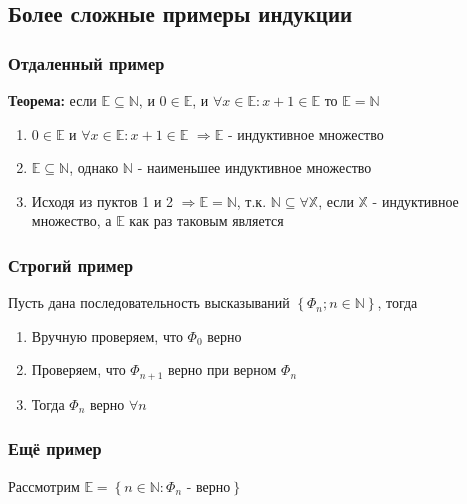 \documentclass[class=article,a4paper,12pt,crop=false]{standalone}
\begin{document}
\subsection{Более сложные примеры индукции}

\subsubsection{Отдаленный пример}

\textbf{Теорема:} если $\mathbb{E} \subseteq \mathbb{N}$, и
$0 \in \mathbb{E}$, и $\forall x \in \mathbb{E}: x + 1 \in \mathbb{E}$
то $\mathbb{E} = \mathbb{N}$

\begin{enumerate}
  \item {
    $0 \in \mathbb{E}$ и $\forall x \in \mathbb{E}: x + 1 \in \mathbb{E}$
    $\Rightarrow \mathbb{E}$ - индуктивное множество 
  }
  \item {
    $\mathbb{E} \subseteq \mathbb{N}$, однако $\mathbb{N}$ - наименьшее
    индуктивное множество
  }
  \item {
    Исходя из пуктов 1 и 2 $\Rightarrow \mathbb{E} = \mathbb{N}$, т.к.
    $\mathbb{N} \subseteq \forall \mathbb{X}$, если $\mathbb{X}$ - 
    индуктивное множество, а $\mathbb{E}$ как раз таковым является
  }
\end{enumerate}

\subsubsection{Строгий пример}

Пусть дана последовательность
высказываний $\left\{ \Phi_n; n\in \mathbb{N}  \right\}$, тогда

\begin{enumerate}
  \item {
    Вручную проверяем, что $\Phi_0$ верно
  }
  \item {
    Проверяем, что $\Phi_{n+1}$ верно при верном $\Phi_n$
  }
  \item {
    Тогда $\Phi_n$ верно $\forall n$
  }
\end{enumerate}

\subsubsection{Ещё пример}

Рассмотрим $\mathbb{E} = \left\{ n \in \mathbb{N}: \Phi_n \text{ - верно} \right\}$
\end{document}

